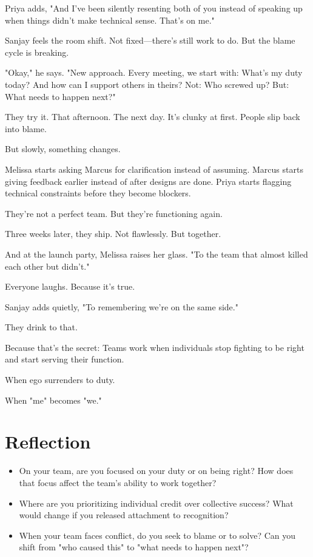 \documentclass[11pt,twoside]{book}
\begin{document}
Priya adds, "And I've been silently resenting both of you instead of speaking up when things didn't make technical sense. That's on me."

Sanjay feels the room shift. Not fixed—there's still work to do. But the blame cycle is breaking.

"Okay," he says. "New approach. Every meeting, we start with: What's my duty today? And how can I support others in theirs? Not: Who screwed up? But: What needs to happen next?"

They try it. That afternoon. The next day. It's clunky at first. People slip back into blame.

But slowly, something changes.

Melissa starts asking Marcus for clarification instead of assuming. Marcus starts giving feedback earlier instead of after designs are done. Priya starts flagging technical constraints before they become blockers.

They're not a perfect team. But they're functioning again.

Three weeks later, they ship. Not flawlessly. But together.

And at the launch party, Melissa raises her glass. "To the team that almost killed each other but didn't."

Everyone laughs. Because it's true.

Sanjay adds quietly, "To remembering we're on the same side."

They drink to that.

Because that's the secret: Teams work when individuals stop fighting to be right and start serving their function.

When ego surrenders to duty.

When "me" becomes "we."

\section*{Reflection}

\begin{itemize}
\item On your team, are you focused on your duty or on being right? How does that focus affect the team's ability to work together?
\item Where are you prioritizing individual credit over collective success? What would change if you released attachment to recognition?
\item When your team faces conflict, do you seek to blame or to solve? Can you shift from "who caused this" to "what needs to happen next"?
\end{itemize}
\end{document}
